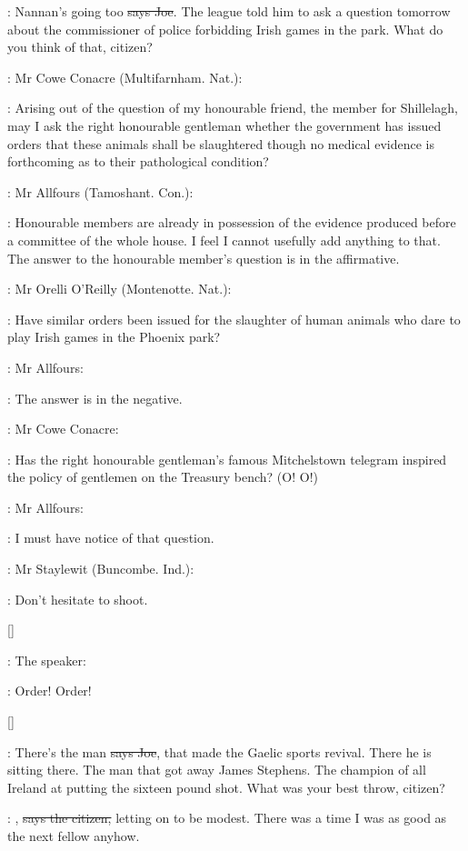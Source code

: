 \joe:
Nannan's going too \sout{says Joe}.
The league told him to ask a question
tomorrow about the commissioner of police forbidding Irish games in the
park. What do you think of that, citizen?

:
Mr Cowe Conacre (Multifarnham. Nat.):

\conacre:
Arising out of the question of my
honourable friend, the member for Shillelagh, may I ask the right
honourable gentleman whether the government has issued orders that these
animals shall be slaughtered though no medical evidence is forthcoming as
to their pathological condition?

:
Mr Allfours (Tamoshant. Con.):

\allfours:
Honourable members are already in
possession of the evidence produced before a committee of the whole house.
I feel I cannot usefully add anything to that. The answer to the
honourable member's question is in the affirmative.

:
Mr Orelli O'Reilly (Montenotte. Nat.): 

\oreilly:
Have similar orders been issued for
the slaughter of human animals
who dare to play Irish games in the
Phoenix park?

:
Mr Allfours: 

\allfours:
The answer is in the negative.

:
Mr Cowe Conacre: 

\conacre:
Has the right honourable gentleman's famous
Mitchelstown telegram inspired the policy of gentlemen on the Treasury
bench? (O! O!)

:
Mr Allfours: 

\allfours:
I must have notice of that question.

:
Mr Staylewit (Buncombe. Ind.): 

\staylewit:
Don't hesitate to shoot.

[]

:
The speaker:

\Speaker:
Order! Order!

[]

\joe:
There's the man \sout{says Joe},
that made the Gaelic sports revival.
There he
is sitting there. The man that got away James Stephens. The champion of
all Ireland at putting the sixteen pound shot. What was your best throw,
citizen?

\citizen:
, \sout{says the citizen,}
letting on to be modest. There was a time
I was as good as the next fellow anyhow.

